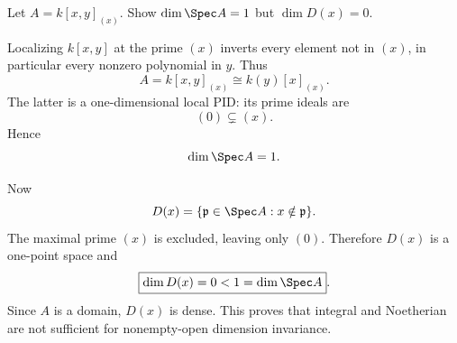 \begin{problem}\label{prob:vi30-11}
Let \(A=k[x,y]_{(x)}\). Show \(\dim\Spec A=1\) but \(\dim D(x)=0\).

\end{problem}

\ifdefined\FullProblemDossiers
\begin{solution}
Localizing \(k[x,y]\) at the prime \((x)\) inverts every element not in \((x)\), in particular every nonzero
polynomial in \(y\). Thus
\[
A=k[x,y]_{(x)}\cong k(y)[x]_{(x)}.
\]
The latter is a one-dimensional local PID: its prime ideals are
\[
(0)\subsetneq(x).
\]
Hence
\[
\dim\Spec A=1.
\]

Now
\[
D(x)=\{\mathfrak p\in\Spec A:x\notin\mathfrak p\}.
\]
The maximal prime \((x)\) is excluded, leaving only \((0)\). Therefore \(D(x)\) is a one-point space and
\[
\boxed{\dim D(x)=0<1=\dim\Spec A}.
\]
Since \(A\) is a domain, \(D(x)\) is dense. This proves that integral and Noetherian are not sufficient for
nonempty-open dimension invariance.
\end{solution}
\fi
